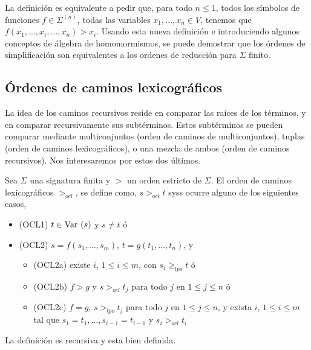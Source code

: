 La definición es equivalente a pedir que, para todo $n \leq 1$, todos
los símbolos de funciones $f \in \Sigma^{(n)}$, todas las variables
$x_1, \dots, x_n \in V$, tenemos que
$f(x_1, \dots, x_i, \dots, x_n) > x_i$. Usando esta nueva definición e
introduciendo algunos conceptos de álgebra de homomormismos, se puede
demostrar que los órdenes de simplificación son equivalentes a los
ordenes de reducción para $\Sigma$ finito.

\subsection{Órdenes de caminos lexicográficos}

La idea de los caminos recursivos reside en comparar las raíces de los
términos, y en comparar recursivamente sus subtérminos. Estos
subtérminos se pueden comparar mediante multiconjuntos (orden de
caminos de multiconjuntos), tuplas (orden de caminos lexicográficos),
o una mezcla de ambos (orden de caminos recursivos). Nos interesaremos
por estos dos últimos.

\begin{defi}
  Sea $\Sigma$ una signatura finita y $>$ un orden estricto de
  $\Sigma$. El orden de caminos lexicográficos $>_{ocl}$, se define
  como, $s>_{ocl}t$ syss ocurre alguno de los siguientes casos,
  \begin{itemize}
  \item (OCL1) $t \in \mbox{Var }(s)$ y $s \not = t$ ó
  \item (OCL2) $s = f(s_1, \dots, s_m)$, $t = g(t_1, \dots, t_n)$, y
    \begin{itemize}
    \item (OCL2a) existe $i$, $1 \leq i \leq m$, con
      $s_i \geq_{lpo} t$ ó
    \item (OCL2b) $f > g$ y $s >_{ocl} t_j$ para todo $j$ en
      $1 \leq j \leq n$ ó
    \item (OCL2c) $f = g$, $s >_{lpo} t_j$ para todo $j$ en
      $1 \leq j \leq n$, y exista $i$, $1 \leq i \leq m$ tal que
      $s_1 = t_1, \dots, s_{i-1} = t_{i-1}$ y $s_i >_{ocl} t_i$
    \end{itemize}
  \end{itemize}
\end{defi}

La definición es recursiva y esta bien definida.



